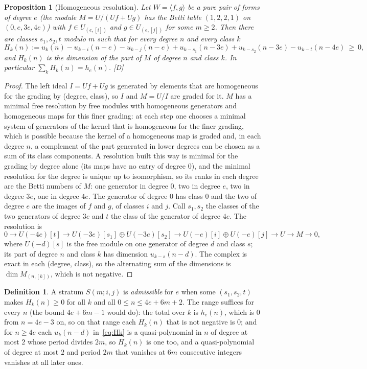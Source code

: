 \documentclass[11pt]{article}
\newtheorem{proposition}{Proposition}
\theoremstyle{definition}
\newtheorem{definition}{Definition}
\theoremstyle{remark}
\begin{document}
\begin{proposition}[Homogeneous resolution]\label{prop:strata}
Let $W=\langle f,g\rangle$ be a pure pair of forms of degree $e$ (the module $M=U/(Uf+Ug)$ has the Betti table $(1,2,2,1)$ on $(0,e,3e,4e)$) with $f\in U_{(e,[i])}$ and $g\in U_{(e,[j])}$ for some $m\ge2$. Then there are classes $s_1,s_2,t$ modulo $m$ such that for every degree $n$ and every class $k$
\begin{equation}\label{eq:Hk}
H_k(n):=u_k(n)-u_{k-i}(n-e)-u_{k-j}(n-e)+u_{k-s_1}(n-3e)+u_{k-s_2}(n-3e)-u_{k-t}(n-4e)\ \ge\ 0,
\end{equation}
and $H_k(n)$ is the dimension of the part of $M$ of degree $n$ and class $k$. In particular $\sum_kH_k(n)=h_e(n)$. [D]
\end{proposition}
\begin{proof}
The left ideal $I=Uf+Ug$ is generated by elements that are homogeneous for the grading by (degree, class), so $I$ and $M=U/I$ are graded for it. $M$ has a minimal free resolution by free modules with homogeneous generators and homogeneous maps for this finer grading: at each step one chooses a minimal system of generators of the kernel that is homogeneous for the finer grading, which is possible because the kernel of a homogeneous map is graded and, in each degree $n$, a complement of the part generated in lower degrees can be chosen as a sum of its class components. A resolution built this way is minimal for the grading by degree alone (its maps have no entry of degree $0$), and the minimal resolution for the degree is unique up to isomorphism, so its ranks in each degree are the Betti numbers of $M$: one generator in degree $0$, two in degree $e$, two in degree $3e$, one in degree $4e$. The generator of degree $0$ has class $0$ and the two of degree $e$ are the images of $f$ and $g$, of classes $i$ and $j$. Call $s_1,s_2$ the classes of the two generators of degree $3e$ and $t$ the class of the generator of degree $4e$. The resolution is
\[
0\to U(-4e)[t]\to U(-3e)[s_1]\oplus U(-3e)[s_2]\to U(-e)[i]\oplus U(-e)[j]\to U\to M\to0,
\]
where $U(-d)[s]$ is the free module on one generator of degree $d$ and class $s$; its part of degree $n$ and class $k$ has dimension $u_{k-s}(n-d)$. The complex is exact in each (degree, class), so the alternating sum of the dimensions is $\dim M_{(n,[k])}$, which is not negative.
\end{proof}

\begin{definition}\label{def:admissible}
A stratum $S(m;i,j)$ is \emph{admissible} for $e$ when some $(s_1,s_2,t)$ makes $H_k(n)\ge0$ for all $k$ and all $0\le n\le4e+6m+2$. The range suffices for every $n$ (the bound $4e+6m-1$ would do): the total over $k$ is $h_e(n)$, which is $0$ from $n=4e-3$ on, so on that range each $H_k(n)$ that is not negative is $0$; and for $n\ge4e$ each $u_k(n-d)$ in~\eqref{eq:Hk} is a quasi-polynomial in $n$ of degree at most $2$ whose period divides $2m$, so $H_k(n)$ is one too, and a quasi-polynomial of degree at most $2$ and period $2m$ that vanishes at $6m$ consecutive integers vanishes at all later ones.
\end{definition}
\end{document}
